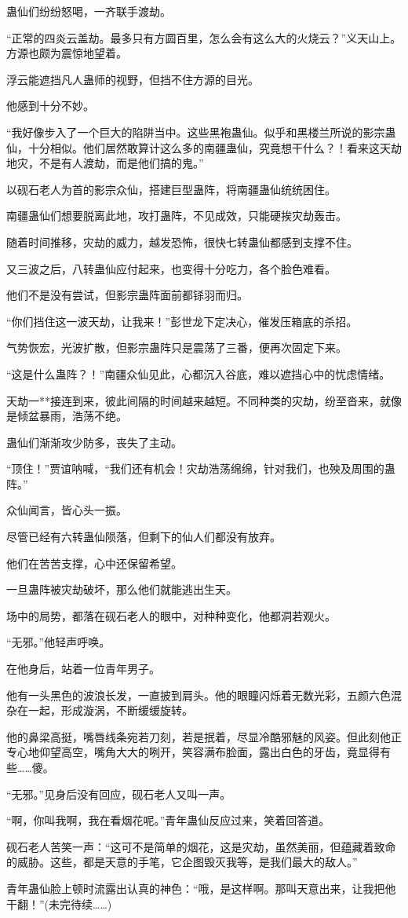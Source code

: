 \begin{this_body}
蛊仙们纷纷怒喝，一齐联手渡劫。

“正常的四炎云盖劫。最多只有方圆百里，怎么会有这么大的火烧云？”义天山上。方源也颇为震惊地望着。

浮云能遮挡凡人蛊师的视野，但挡不住方源的目光。

他感到十分不妙。

“我好像步入了一个巨大的陷阱当中。这些黑袍蛊仙。似乎和黑楼兰所说的影宗蛊仙，十分相似。他们居然敢算计这么多的南疆蛊仙，究竟想干什么？！看来这天劫地灾，不是有人渡劫，而是他们搞的鬼。”

以砚石老人为首的影宗众仙，搭建巨型蛊阵，将南疆蛊仙统统困住。

南疆蛊仙们想要脱离此地，攻打蛊阵，不见成效，只能硬挨灾劫轰击。

随着时间推移，灾劫的威力，越发恐怖，很快七转蛊仙都感到支撑不住。

又三波之后，八转蛊仙应付起来，也变得十分吃力，各个脸色难看。

他们不是没有尝试，但影宗蛊阵面前都铩羽而归。

“你们挡住这一波天劫，让我来！”彭世龙下定决心，催发压箱底的杀招。

气势恢宏，光波扩散，但影宗蛊阵只是震荡了三番，便再次固定下来。

“这是什么蛊阵？！”南疆众仙见此，心都沉入谷底，难以遮挡心中的忧虑情绪。

天劫一**接连到来，彼此间隔的时间越来越短。不同种类的灾劫，纷至沓来，就像是倾盆暴雨，浩荡不绝。

蛊仙们渐渐攻少防多，丧失了主动。

“顶住！”贾谊呐喊，“我们还有机会！灾劫浩荡绵绵，针对我们，也殃及周围的蛊阵。”

众仙闻言，皆心头一振。

尽管已经有六转蛊仙陨落，但剩下的仙人们都没有放弃。

他们在苦苦支撑，心中还保留希望。

一旦蛊阵被灾劫破坏，那么他们就能逃出生天。

场中的局势，都落在砚石老人的眼中，对种种变化，他都洞若观火。

“无邪。”他轻声呼唤。

在他身后，站着一位青年男子。

他有一头黑色的波浪长发，一直披到肩头。他的眼瞳闪烁着无数光彩，五颜六色混杂在一起，形成漩涡，不断缓缓旋转。

他的鼻梁高挺，嘴唇线条宛若刀刻，若是抿着，尽显冷酷邪魅的风姿。但此刻他正专心地仰望高空，嘴角大大的咧开，笑容满布脸面，露出白色的牙齿，竟显得有些……傻。

“无邪。”见身后没有回应，砚石老人又叫一声。

“啊，你叫我啊，我在看烟花呢。”青年蛊仙反应过来，笑着回答道。

砚石老人苦笑一声：“这可不是简单的烟花，这是灾劫，虽然美丽，但蕴藏着致命的威胁。这些，都是天意的手笔，它企图毁灭我等，是我们最大的敌人。”

青年蛊仙脸上顿时流露出认真的神色：“哦，是这样啊。那叫天意出来，让我把他干翻！”(未完待续……)

\end{this_body}

